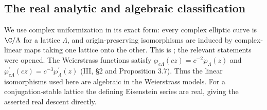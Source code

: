 \subsection{The real analytic and algebraic classification}
We use complex uniformization in its exact form: every complex elliptic curve is $\C/\Lambda$ for a lattice $\Lambda$, and origin-preserving isomorphisms are induced by complex-linear maps taking one lattice onto the other. This is \cite[III, Theorem 3.10 and Proposition 3.3]{MilneEC2021A567}; the relevant statements were opened. The Weierstrass functions satisfy $\wp_{c\Lambda}(cz)=c^{-2}\wp_\Lambda(z)$ and $\wp_{c\Lambda}^{\prime}(cz)=c^{-3}\wp_\Lambda^{\prime}(z)$ (III, \S2 and Proposition 3.7). Thus the linear isomorphisms used here are algebraic in the Weierstrass models. For a conjugation-stable lattice the defining Eisenstein series are real, giving the asserted real descent directly.

